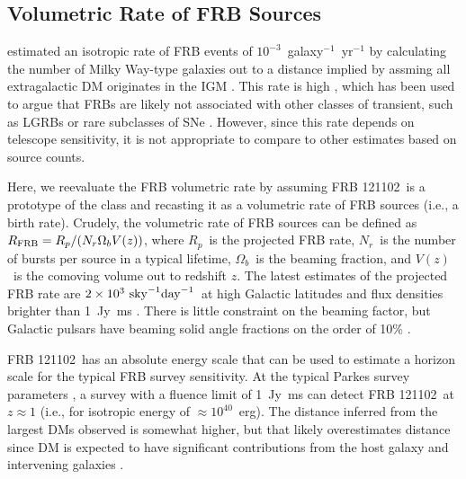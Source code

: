 \documentclass[twocolumn]{aastex61}
\newcommand{\frb}{FRB 121102}
\begin{document}
\subsection{Volumetric Rate of FRB Sources}

\citet{2013Sci...341...53T} estimated an isotropic rate of FRB events of $10^{-3}$\ galaxy$^{-1}$\ yr$^{-1}$ by calculating the number of Milky Way-type galaxies out to a distance implied by assming all extragalactic DM originates in the IGM \citep[$z\approx0.9$\ for DM$\approx z\times900\ \rm{pc}\ \rm{cm}^{-3}$;][]{2003ApJ...598L..79I,2004MNRAS.348..999I}. This rate is high \citep[comparable to the rate of core-collapse supernovae;][]{2006Natur.439...45D}, which has been used to argue that FRBs are likely not associated with other classes of transient, such as LGRBs or rare subclasses of SNe \citep{2006ARA&A..44..507W}. However, since this rate depends on telescope sensitivity, it is not appropriate to compare to other estimates based on source counts.

Here, we reevaluate the FRB volumetric rate by assuming \frb\ is a prototype of the class and recasting it as a volumetric rate of FRB sources (i.e., a birth rate). Crudely, the volumetric rate of FRB sources can be defined as $R_{\rm{FRB}} = R_p /(N_r \Omega_b V (z))$, where $R_p$\ is the projected FRB rate, $N_r$\ is the number of bursts per source in a typical lifetime, $\Omega_b$\ is the beaming fraction, and $V(z)$\ is the comoving volume out to redshift $z$. The latest estimates of the projected FRB rate are $2\times10^3\ \rm{sky}^{-1} \rm{day}^{-1}$\ at high Galactic latitudes and flux densities brighter than 1~Jy~ms \citep{2016arXiv161100458L, 2016MNRAS.460L..30C, 2016MNRAS.455.2207R}. There is little constraint on the beaming factor, but Galactic pulsars have beaming solid angle fractions on the order of 10\% \citep{1998MNRAS.298..625T}.

\frb\ has an absolute energy scale that can be used to estimate a horizon scale for the typical FRB survey sensitivity. At the typical Parkes survey parameters \citep[e.g.,][]{2016MNRAS.460L..30C}, a survey with a fluence limit of 1~Jy~ms can detect \frb\ at $z\approx1$ (i.e., for isotropic energy of $\approx10^{40}$~erg). The distance inferred from the largest DMs observed \citep[$\sim1500$\ pc cm$^{-3}$;][]{2016MNRAS.460L..30C} is somewhat higher, but that likely overestimates distance since DM is expected to have significant contributions from the host galaxy and intervening galaxies \citep{OPT, 2014ApJ...780L..33M}.
\end{document}
